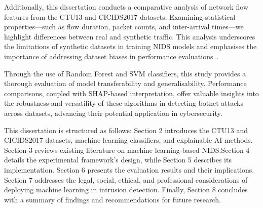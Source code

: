 Additionally, this dissertation conducts a comparative analysis of network flow features from the CTU13 and CICIDS2017 datasets. Examining statistical properties—such as flow duration, packet counts, and inter-arrival times—we highlight differences between real and synthetic traffic. This analysis underscores the limitations of synthetic datasets in training NIDS models and emphasises the importance of addressing dataset biases in performance evaluations~\cite{sommer2010outside}.

Through the use of Random Forest and SVM classifiers, this study provides a thorough evaluation of model transferability and generalisability. Performance comparisons, coupled with SHAP-based interpretation, offer valuable insights into the robustness and versatility of these algorithms in detecting botnet attacks across datasets, advancing their potential application in cybersecurity.

This dissertation is structured as follows: Section 2 introduces the CTU13 and CICIDS2017 datasets, machine learning classifiers, and explainable AI methods. Section 3 reviews existing literature on machine learning-based NIDS.\@ Section 4 details the experimental framework’s design, while Section 5 describes its implementation. Section 6 presents the evaluation results and their implications. Section 7 addresses the legal, social, ethical, and professional considerations of deploying machine learning in intrusion detection. Finally, Section 8 concludes with a summary of findings and recommendations for future research.